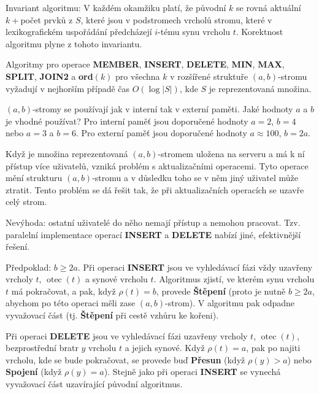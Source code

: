 \documentclass[a4paper,12pt]{article}
\DeclareMathOperator*{\otec}{otec}
\begin{document}
Invariant algoritmu: V každém okamžiku platí, 
že původní $k$ se rovná aktuální $k+$počet prvků z 
$S$, které jsou v podstromech vrcholů stromu, které v 
lexikografickém uspořádání předcházejí $i$-tému synu 
vrcholu $t$. Korektnost algoritmu plyne z tohoto 
invariantu.

\begin{veta}Algoritmy pro operace {\bf MEMBER}, {\bf INSERT}, 
{\bf DE\-LETE}, {\bf MIN}, {\bf MAX}, {\bf SPLIT}, {\bf JOIN2} a {\bf ord$
(k)$} pro všechna $k$ v 
rozšířené struktuře $(a,b)$-stromu vy\-ža\-dují v 
nejhorším pří\-pa\-dě čas $O(\log|S|)$, kde $S$ je reprezentovaná 
množina.  
\end{veta}

$(a,b)$-stromy se používají jak v interní tak v 
externí paměti. Jaké hodnoty $a$ a $b$ je vhodné 
používat?\newline 
Pro interní paměť jsou doporučené hodnoty $a=2$, $
b=4$ 
nebo $a=3$ a $b=6$.\newline 
Pro externí paměť jsou doporučené hodnoty $a\approx 
100$, 
$b=2a$.

Když je množina reprezentovaná $(a,b)$-stromem 
uložena na serveru a má k ní přístup více 
uživatelů, vzniká problém s aktualizačními 
operacemi. Tyto operace mění strukturu $(a,b)$-stromu a 
v důsledku toho se v něm jiný uživatel 
může ztratit. Tento problém se dá  
řešit tak, že při aktu\-alizačních operacích 
se uzavře celý strom.

 

Nevýhoda: ostatní uživatelé  
do něho nemají přístup a nemohou pracovat. Tzv. paralelní 
implementace operací {\bf INSERT} a {\bf DELETE} nabízí jiné, 
efektivnější řešení.

Předpoklad: $b\ge 2a$. \newline 
Při operaci {\bf INSERT} jsou ve vyhledávací fázi vždy 
uzavřeny vrcholy $t$, $\otec(t)$ a synové vrcholu $t$. 
Algoritmus zjistí, ve kterém synu vrcholu $t$ má 
pokračovat, a pak, když $\rho (t)=b$, provede {\bf Štěpení }
(proto je nutně $b\ge 2a$, abychom po této ope\-raci měli 
zase $(a,b)$-strom). V algoritmu pak odpadne vyva\-žo\-vací 
část (tj. {\bf Štěpení} při cestě vzhůru ke 
kořeni).

Při operaci {\bf DELETE} jsou ve vyhledávací fázi uzavřeny 
vrcholy $t$, $\otec(t)$, bezprostřední bratr $y$ vrcholu $
t$ a 
jejich synové. 
Když $\rho (t)=a$, pak po najiti vrcholu, kde se bude 
pokračovat, se provede buď {\bf Přesun} (když $\rho (
y)>a$) nebo 
{\bf Spojení} (když $\rho (y)=a$). Stejně jako při operaci 
{\bf INSERT} se vynechá vyva\-žo\-vací část 
uzavírající původní algoritmus.
\end{document}
